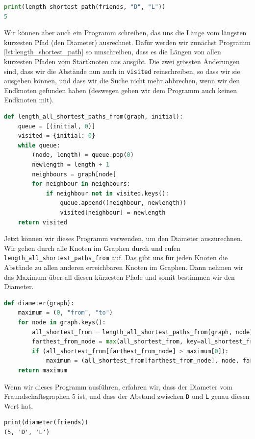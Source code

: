\begin{enumerate}[(a)]
\begin{lstlisting}[language=Python]
print(length_shortest_path(friends, "D", "L"))
5
\end{lstlisting}
Wir können aber auch ein Programm schreiben, das uns die Länge vom längsten kürzesten Pfad (den Diameter) ausrechnet. Dafür werden wir zunächst Programm \ref{lst:length_shortest_path} so umschreiben, dass es die Längen von allen kürzesten Pfaden vom Startknoten aus ausgibt. Die zwei grössten Änderungen sind, dass wir die Abstände nun auch in \texttt{visited} reinschreiben, so dass wir sie ausgeben können, und dass wir die Suche nicht mehr abbrechen, wenn wir den Endknoten gefunden haben (deswegen geben wir dem Programm auch keinen Endknoten mit).
\begin{lstlisting}[language=Python, caption={Programm, welches die Abstände vom Startknoten zu allen anderen erreichbaren Knoten ausrechnet}]
def length_all_shortest_paths_from(graph, initial):
    queue = [(initial, 0)]
    visited = {initial: 0}
    while queue:
        (node, length) = queue.pop(0)
        newlength = length + 1
        neighbours = graph[node]
        for neighbour in neighbours:
            if neighbour not in visited.keys():
                queue.append((neighbour, newlength))
                visited[neighbour] = newlength
    return visited
\end{lstlisting}
Jetzt können wir dieses Programm verwenden, um den Diameter auszurechnen. Wir gehen durch alle Knoten im Graphen durch und rufen \texttt{length\_all\_shortest\_paths\_from} auf. Das gibt uns für jeden Knoten die Abstände zu allen anderen erreichbaren Knoten im Graphen. Dann nehmen wir das Maximum über all diesen kürzesten Pfade und somit bestimmen wir den Diameter.
\begin{lstlisting}[language=Python, caption={Programm, welches den Diameter von einem Graphen bestimmt}]
def diameter(graph):
    maximum = (0, "from", "to")
    for node in graph.keys():
        all_shortest_from = length_all_shortest_paths_from(graph, node)
        farthest_from_node = max(all_shortest_from, key=all_shortest_from.get)
        if (all_shortest_from[farthest_from_node] > maximum[0]):
            maximum = (all_shortest_from[farthest_from_node], node, farthest_from_node)
    return maximum
\end{lstlisting}
Wenn wir dieses Programm ausführen, erfahren wir, dass der Diameter vom Fraundschaftsgraphen 5 ist, und dass der Abstand zwischen \texttt{D} und \texttt{L} genau diesen Wert hat.
\begin{lstlisting}
print(diameter(friends))
(5, 'D', 'L')
\end{lstlisting}
\end{enumerate}

